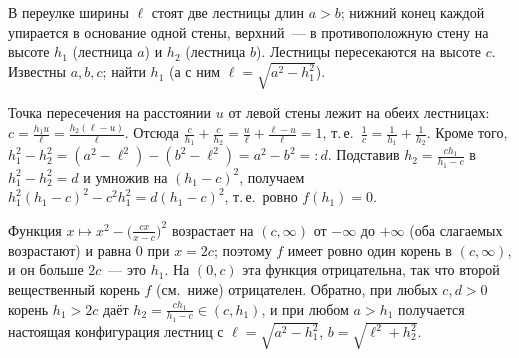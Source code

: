 \begin{remark}
В переулке ширины $\ell$ стоят две лестницы длин $a>b$; нижний конец каждой упирается в основание одной стены, верхний~---
в противоположную стену на высоте $h_1$ (лестница $a$) и $h_2$ (лестница $b$). Лестницы пересекаются на высоте $c$. Известны
$a,b,c$; найти $h_1$ (а с ним $\ell=\sqrt{a^2-h_1^2}$).

Точка пересечения на расстоянии $u$ от левой стены лежит на обеих лестницах: $c=\frac{h_1u}\ell=\frac{h_2(\ell-u)}\ell$. Отсюда
$\frac c{h_1}+\frac c{h_2}=\frac u\ell+\frac{\ell-u}\ell=1$, т.\,е.\ $\frac1c=\frac1{h_1}+\frac1{h_2}$. Кроме того, $h_1^2-h_2^2=(a^2-\ell^2)-(b^2-\ell^2)=a^2-b^2=:d$.
Подставив $h_2=\frac{ch_1}{h_1-c}$ в $h_1^2-h_2^2=d$ и умножив на $(h_1-c)^2$, получаем $h_1^2(h_1-c)^2-c^2h_1^2=d(h_1-c)^2$, т.\,е.\ ровно
$f(h_1)=0$.

Функция $x\mapsto x^2-\bigl(\frac{cx}{x-c}\bigr)^2$ возрастает на $(c,\infty)$ от $-\infty$ до $+\infty$ (оба слагаемых возрастают) и равна $0$ при $x=2c$;
поэтому $f$ имеет ровно один корень в $(c,\infty)$, и он больше $2c$~--- это $h_1$. На $(0,c)$ эта функция отрицательна, так что второй
вещественный корень $f$ (см.\ ниже) отрицателен. Обратно, при любых $c,d>0$ корень $h_1>2c$ даёт $h_2=\frac{ch_1}{h_1-c}\in(c,h_1)$, и
при любом $a>h_1$ получается настоящая конфигурация лестниц с $\ell=\sqrt{a^2-h_1^2}$, $b=\sqrt{\ell^2+h_2^2}$.
\end{remark}

\begin{keepfig}
\begin{center}
\end{center}
\end{keepfig}

